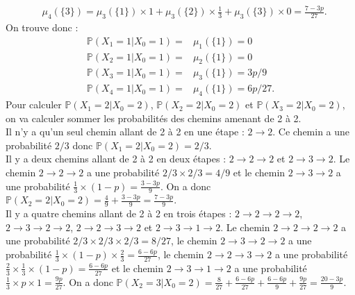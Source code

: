 \documentclass[11pt, answers]{exam}
\def \P {\mathbb P}
\begin{document}
\begin{questions}
\begin{parts}
\begin{solution}
\[\begin{aligned}
&\mu_4(\{3\})=\mu_3(\{1\})\times 1+\mu_3(\{2\})\times \frac{1}{3}+\mu_3(\{3\})\times 0=\frac{7-3p}{27}.
\end{aligned}
\]
On trouve donc :
\[
\begin{aligned}
\P (X_1 = 1|X_0 = 1)=& \mu_1(\{1\})=0 \\
\P (X_2 = 1|X_0 = 1)=& \mu_2(\{1\})=0 \\
\P (X_3 = 1|X_0 = 1)=& \mu_3(\{1\})=3p/9 \\
\P (X_4 = 1|X_0 = 1)=& \mu_4(\{1\})=6p/27.
\end{aligned}
\]
Pour calculer $\P (X_1 = 2|X_0 = 2)$, $\P (X_2 = 2|X_0 = 2)$ et $\P (X_3 = 2|X_0 = 2)$, on va calculer sommer les probabilités des chemins amenant de 2 à 2.\\
Il n'y a qu'un seul chemin allant de 2 à 2 en une étape : $2\rightarrow 2$. Ce chemin a une probabilité $2/3$ donc $\P (X_1 = 2|X_0 = 2)=2/3$.\\
Il y a deux chemins allant de 2 à 2 en deux étapes : $2\rightarrow 2 \rightarrow 2$ et $2\rightarrow 3 \rightarrow 2$. Le chemin $2\rightarrow 2 \rightarrow 2$ a une probabilité $2/3\times 2/3=4/9$ et le chemin $2\rightarrow 3 \rightarrow 2$ a une probabilité $\frac{1}{3}\times (1-p)=\frac{3-3p}{9}$. On a donc $\P (X_2 = 2|X_0 = 2)=\frac{4}{9}+\frac{3-3p}{9}=\frac{7-3p}{9}$.\\
Il y a quatre chemins allant de 2 à 2 en trois étapes : $2\rightarrow 2 \rightarrow 2 \rightarrow 2$, $2\rightarrow 3 \rightarrow 2 \rightarrow 2$, $2\rightarrow 2 \rightarrow 3 \rightarrow 2$ et $2\rightarrow 3 \rightarrow 1 \rightarrow 2$. Le chemin $2\rightarrow 2 \rightarrow 2 \rightarrow 2$ a une probabilité $2/3\times 2/3\times 2/3=8/27$, le chemin $2\rightarrow 3 \rightarrow 2 \rightarrow 2$ a une probabilité $\frac{1}{3}\times (1-p)\times \frac{2}{3}=\frac{6-6p}{27}$, le chemin $2\rightarrow 2 \rightarrow 3 \rightarrow 2$ a une probabilité $\frac{2}{3}\times \frac{1}{3}\times (1-p)=\frac{6-6p}{27}$ et le chemin $2\rightarrow 3 \rightarrow 1 \rightarrow 2$ a une probabilité $\frac{1}{3}\times p\times 1=\frac{9p}{27}$. On a donc $\P (X_2 = 3|X_0 = 2)=\frac{8}{27}+\frac{6-6p}{27}+\frac{6-6p}{9}+\frac{9p}{27}=\frac{20-3p}{9}$.
\end{solution}

\end{parts}
\end{questions}
\end{document}
